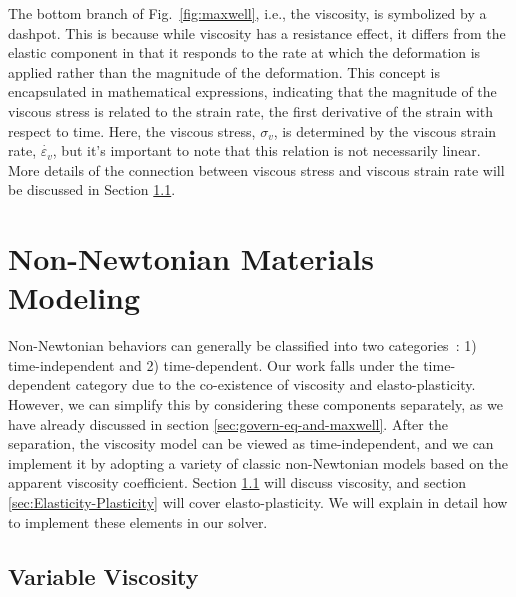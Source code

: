 \documentclass[10pt,journal,compsoc]{IEEEtran}
\begin{document}
The bottom branch of Fig.~\ref{fig:maxwell}, i.e., the viscosity, is symbolized by a dashpot. This is because while viscosity has a resistance effect, it differs from the elastic component in that it responds to the rate at which the deformation is applied rather than the magnitude of the deformation. This concept is encapsulated in mathematical expressions, indicating that the magnitude of the viscous stress is related to the strain rate, the first derivative of the strain with respect to time. Here, the viscous stress, $\sigma_{v}$, is determined by the viscous strain rate, $\dot{\varepsilon_{v}}$, but it's important to note that this relation is not necessarily linear.
More details of the connection between viscous stress and viscous strain rate will be discussed in Section \ref{sec:variable-viscosity}.







\section{Non-Newtonian Materials Modeling}\label{sec:Non-Newtonian model}


Non-Newtonian behaviors can generally be classified into two categories~\cite{Phan2017,Chhabra2010}: 1) time-independent and 2) time-dependent. Our work falls under the time-dependent category due to the co-existence of viscosity and elasto-plasticity. However, we can simplify this by considering these components separately, as we have already discussed in section \ref{sec:govern-eq-and-maxwell}.
After the separation, the viscosity model can be viewed as time-independent, and we can implement it by adopting a variety of classic non-Newtonian models based on the apparent viscosity coefficient. Section \ref{sec:variable-viscosity} will discuss viscosity, and section \ref{sec:Elasticity-Plasticity} will cover elasto-plasticity. We will explain in detail how to implement these elements in our solver.




\subsection{Variable Viscosity}\label{sec:variable-viscosity}
\end{document}

